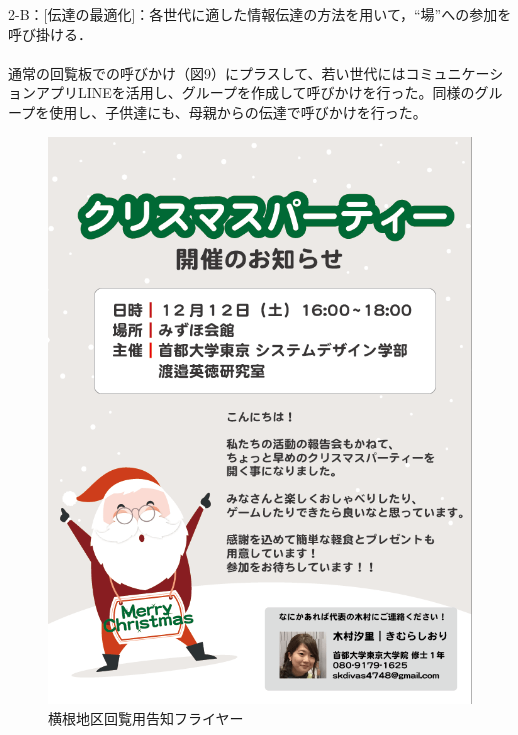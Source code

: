 \documentclass[a4paper]{jsarticle}
\begin{document}
2-B：[伝達の最適化]：各世代に適した情報伝達の方法を用いて，“場”への参加を呼び掛ける．\\\\
通常の回覧板での呼びかけ（図9）にプラスして、若い世代にはコミュニケーションアプリLINEを活用し、グループを作成して呼びかけを行った。同様のグループを使用し、子供達にも、母親からの伝達で呼びかけを行った。

\begin{figure}[H]
  \begin{center}
    \includegraphics[width=0.95\hsize]{./images/05.png}
    \caption{横根地区回覧用告知フライヤー}
    \label{chirstmas2}
  \end{center}
\end{figure}
\end{document}
